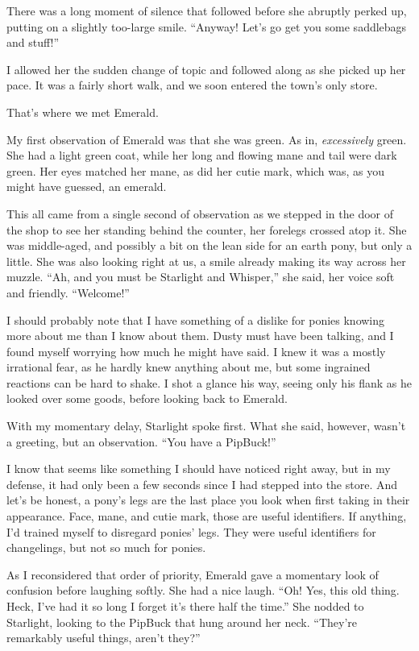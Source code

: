 There was a long moment of silence that followed before she abruptly perked up, putting on a slightly too-large smile. “Anyway! Let’s go get you some saddlebags and stuff!”

I allowed her the sudden change of topic and followed along as she picked up her pace. It was a fairly short walk, and we soon entered the town’s only store.

That’s where we met Emerald.

My first observation of Emerald was that she was green. As in, \textit{excessively} green. She had a light green coat, while her long and flowing mane and tail were dark green. Her eyes matched her mane, as did her cutie mark, which was, as you might have guessed, an emerald.

This all came from a single second of observation as we stepped in the door of the shop to see her standing behind the counter, her forelegs crossed atop it. She was middle-aged, and possibly a bit on the lean side for an earth pony, but only a little. She was also looking right at us, a smile already making its way across her muzzle. “Ah, and you must be Starlight and Whisper,” she said, her voice soft and friendly. “Welcome!”

I should probably note that I have something of a dislike for ponies knowing more about me than I know about them. Dusty must have been talking, and I found myself worrying how much he might have said. I knew it was a mostly irrational fear, as he hardly knew anything about me, but some ingrained reactions can be hard to shake. I shot a glance his way, seeing only his flank as he looked over some goods, before looking back to Emerald.

With my momentary delay, Starlight spoke first. What she said, however, wasn’t a greeting, but an observation. “You have a PipBuck!”

I know that seems like something I should have noticed right away, but in my defense, it had only been a few seconds since I had stepped into the store. And let’s be honest, a pony’s legs are the last place you look when first taking in their appearance. Face, mane, and cutie mark, those are useful identifiers. If anything, I’d trained myself to disregard ponies’ legs. They were useful identifiers for changelings, but not so much for ponies.

As I reconsidered that order of priority, Emerald gave a momentary look of confusion before laughing softly. She had a nice laugh. “Oh! Yes, this old thing. Heck, I’ve had it so long I forget it’s there half the time.” She nodded to Starlight, looking to the PipBuck that hung around her neck. “They’re remarkably useful things, aren’t they?”

